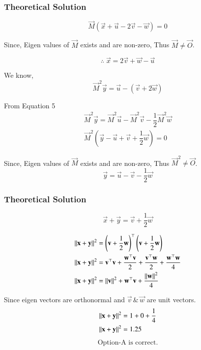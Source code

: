 \documentclass{beamer}
\begin{document}
\begin{frame}[fragile]
    \frametitle{Theoretical Solution}
\begin{equation}
    \vec{M}(\vec{x} + \vec{u} - 2\vec{v} - \vec{w}) = 0
\end{equation}

Since, Eigen values of $\vec{M}$ exists and are non-zero, Thus $\vec{M} \neq \vec{O}$.

\begin{equation}
    \therefore \; \vec{x} = 2\vec{v} + \vec{w} -\vec{u}
\end{equation}

We know,
\begin{equation}
\vec{M}^2\vec{y} = \vec{u} - (\vec{v} + 2\vec{w})
\end{equation} 

From Equation 5
\begin{align}
    \vec{M}^2\vec{y} = \vec{M}^2\vec{u} - \vec{M}^2\vec{v} - \dfrac{1}{2}\vec{M}^2\vec{w} \\
\vec{M}^2(\vec{y} - \vec{u} + \vec{v} + \dfrac{1}{2}\vec{w}) = 0
\end{align}

Since, Eigen values of $\vec{M}$ exists and are non-zero, Thus $\vec{M}^2 \neq \vec{O}$.
\begin{equation}
    \vec{y} = \vec{u} - \vec{v} - \dfrac{1}{2}\vec{w}
\end{equation}
\end{frame}

\begin{frame}[fragile]
    \frametitle{Theoretical Solution}
\begin{equation}
    \vec{x} + \vec{y} = \vec{v} + \dfrac{1}{2}\vec{w}
\end{equation}

\begin{align}
    \left\lVert\mathbf{x} + \mathbf{y}\right\rVert^2 &= \left(\mathbf{v} + \frac{1}{2}\mathbf{w}\right)^\top\left(\mathbf{v} + \frac{1}{2}\mathbf{w}\right) \\
     \left\lVert\mathbf{x} + \mathbf{y}\right\rVert^2 &= \mathbf{v}^\top\mathbf{v} + \frac{\mathbf{w}^\top\mathbf{v}}{2} + \dfrac{\mathbf{v}^\top\mathbf{w}}{2} + \dfrac{\mathbf{w}^\top\mathbf{w}}{4} \\
\left\lVert\mathbf{x}+\mathbf{y}\right\rVert^2 &= \left\lVert\mathbf{v}\right\rVert^2 + \mathbf{w}^\top\mathbf{v} + \dfrac{\left\lVert\mathbf{w}\right\rVert^2}{4}
\end{align}

Since eigen vectors are orthonormal and $\vec{v} \, \& \, \vec{w}$ are unit vectors.
\begin{align}
\left\lVert\mathbf{x} + \mathbf{y}\right\rVert^2 &= 1 + 0 + \dfrac{1}{4} \\
    \left\lVert\mathbf{x} + \mathbf{y}\right\rVert^2 &= 1.25
\end{align}
\begin{align*}
    \boxed{\text{Option-A is correct.}}
\end{align*}
\end{frame}
\end{document}
